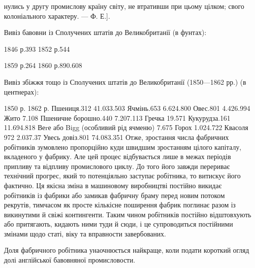 нулись у другу промислову країну світу, не втративши при цьому цілком;
свого колоніального характеру. — Ф. Е.].

Вивіз бавовни із Сполучених штатів до Великобританії (в фунтах):

1846 р.393    1852 р.544

1859 р.264    1860 р.890.608

Вивіз збіжжя тощо із Сполучених штатів до Великобританії
(1850—1862 рр.) (в центнерах):

                                                            1850 р.                 1862 р.
Пшениця.312           41.033.503
Ячмінь.653           6.624.800
Овес.801             4.426.994
Жито                 7.108
Пшеничне борошно.440           7.207.113
Гречка                  19.571
Кукурудза.161         11.694.818
Веrе або Bigg (особливий
рід ячменю)                    7.675
Горох              1.024.722
Квасоля 972              2.037.37
Увесь довіз.801            74.083.351
Отже, зростання числа фабричних робітників зумовлено пропорційно
куди швидшим зростанням цілого капіталу, вкладеного
у фабрику. Але цей процес відбувається лише в межах періодів
припливу та відпливу промислового циклу. До того його завжди
перериває технічний прогрес, який то потенціяльно заступає робітника,
то витискує його фактично. Ця якісна зміна в машиновому
виробництві постійно викидає робітників із фабрики або замикав
фабричну браму перед новим потоком рекрутів, тимчасом як
просте кількісне поширення фабрик поглинає разом із викинутими
й свіжі контингенти. Таким чином робітників постійно відштовхують
або притягають, кидають ними туди й сюди, і це
супроводиться постійними змінами щодо статі, віку та вправности
завербованих.

Доля фабричного робітника унаочнюється найкраще, коли
подати короткий огляд долі англійської бавовняної промисловости.

